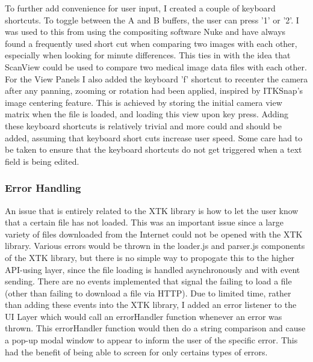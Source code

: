 \documentclass[a4paper,11pt,twoside]{article}
\begin{document}
To further add convenience for user input, I created a couple of keyboard shortcuts. To toggle between the A and B buffers, the user can press '1' or '2'. I was used to this from using the compositing software Nuke and have always found a frequently used short cut when comparing two images with each other, especially when looking for minute differences. This ties in with the idea that ScanView could be used to compare two medical image data files with each other. For the View Panels I also added the keyboard 'f' shortcut to recenter the camera after any panning, zooming or rotation had been applied, inspired by ITKSnap's image centering feature. This is achieved by storing the initial camera view matrix when the file is loaded, and loading this view upon key press. Adding these keyboard shortcuts is relatively trivial and more could and should be added, assuming that keyboard short cuts increase user speed. Some care had to be taken to ensure that the keyboard shortcuts do not get triggered when a text field is being edited.




\subsubsection{Error Handling}
An issue that is entirely related to the XTK library is how to let the user know that a certain file has not loaded. This was an important issue since a large variety of files downloaded from the Internet could not be opened with the XTK library. Various errors would be thrown in the loader.js and parser.js components of the XTK library, but there is no simple way to propogate this to the higher API-using layer, since the file loading is handled asynchronously and with event sending. There are no events implemented that signal the failing to load a file (other than failing to download a file via HTTP). Due to limited time, rather than adding these events into the XTK library, I added an error listener to the UI Layer which would call an errorHandler function whenever an error was thrown. This errorHandler function would then do a string comparison and cause a pop-up modal window to appear to inform the user of the specific error. This had the benefit of being able to screen for only certains types of errors.
\end{document}
